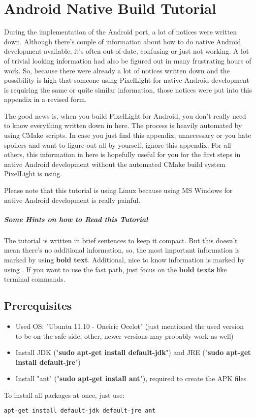 \chapter{Android Native Build Tutorial}
\label{Appendix:AndroidNativeBuildTutorial}
During the implementation of the Android port, a lot of notices were written down. Although there's couple of information about how to do native Android development available, it's often out-of-date, confusing or just not working. A lot of trivial looking information had also be figured out in many frustrating hours of work. So, because there were already a lot of notices written down and the possibility is high that someone using PixelLight for native Android development is requiring the same or quite similar information, those notices were put into this appendix in a revised form.

The good news is, when you build PixelLight for Android, you don't really need to know everything written down in here. The process is heavily automated by using CMake scripts. In case you just find this appendix, unnecessary or you hate spoilers and want to figure out all by yourself, ignore this appendix. For all others, this information in here is hopefully useful for you for the first steps in native Android development without the automated CMake build system PixelLight is using.

Please note that this tutorial is using Linux because using \ac{MS} Windows for native Android development is really painful.


\paragraph{Some Hints on how to Read this Tutorial}
The tutorial is written in brief sentences to keep it compact. But this doesn't mean there's no additional information, so, the most important information is marked by using \textbf{bold text}. Additional, nice to know information is marked by using \textrightarrow. If you want to use the fast path, just focus on the \textbf{bold texts} like terminal commands.




\section{Prerequisites}
\begin{itemize}
\item{Used \ac{OS}: "Ubuntu 11.10 - Oneiric Ocelot" (just mentioned the used version to be on the safe side, other, newer versions may probably work as well)}
\item{Install \ac{JDK} ("\textbf{sudo apt-get install default-jdk}") and \ac{JRE} ("\textbf{sudo apt-get install default-jre}")}
\item{Install "ant" ("\textbf{sudo apt-get install ant}"), required to create the \ac{APK} files}
\end{itemize}
To install all packages at once, just use: 
\begin{lstlisting}[language=sh]
apt-get install default-jdk default-jre ant
\end{lstlisting}


